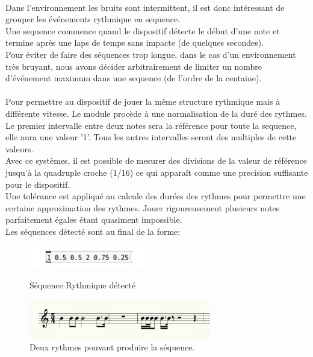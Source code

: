 \documentclass[a4paper, titlepage, oneside, 12pt]{article}%
\begin{document}
\paragraph{}
Dans l’environnement les bruits sont intermittent, il est donc intéressant de grouper les événements rythmique en sequence. \\
Une sequence commence quand le dispositif détecte le début d'une note et termine après une laps de temps sans impacte (de quelques secondes).\\
Pour éviter de faire des séquences trop longue, dans le cas d'un environnement très bruyant, nous avons décider arbitrairement de limiter un nombre d’événement maximum dans une sequence (de l'ordre de la centaine).

\paragraph{}
Pour permettre au dispositif de jouer la même structure rythmique mais à différente vitesse. Le module procède à une normalisation de la duré des rythmes.\\
Le premier intervalle entre deux notes sera la référence pour toute la sequence, elle aura une valeur '1'. Tous les autres intervalles seront des multiples de cette valeurs.\\
Avec ce systèmes, il est possible de mesurer des divisions de la valeur de référence jusqu'à la quadruple croche (1/16) ce qui apparaît comme une  precision suffisante pour le dispositif.\\
Une tolérance est appliqué au calcule des durées des rythmes pour permettre une certaine approximation des rythmes. Jouer rigoureusement  plusieurs notes parfaitement égales étant quasiment impossible.\\
Les séquences détecté sont au final de la forme:\\
\begin{figure}[H]
	\centering
	\includegraphics[width=200px] {rythme.jpg}
	\caption{ Séquence Rythmique détecté}
	\includegraphics[width=300px]{structurerythme.jpg}
	\caption{Deux rythmes pouvant produire la séquence.}
\end{figure}
\end{document}
